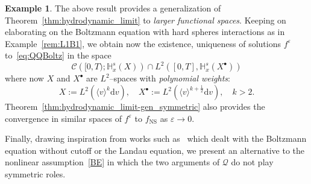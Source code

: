 \documentclass[10pt]{amsart}
\theoremstyle{definition}\newtheorem{defi}[theo]{Definition}\newtheorem{rema}[theo]{Remark}\newtheorem{exam}[theo]{Example}\newtheorem{exem}[theo]{Example}\newtheorem{nota}[theo]{Notation}
\newcommand{\ns}{\mathrm{NS}}
\renewcommand{\d}{\mathrm{d}}
\newcommand{\bbH}{\mathbb{H}}
\newcommand{\CC}{\mathcal{C}}
\newcommand{\QQ}{\mathcal{Q}}
\newcommand{\Sl}{X}
\newcommand{\Slp}{X^{\bullet}}
\newcommand*\eps{{\varepsilon}}
\newcommand{\la}{\langle}
\newcommand{\ra}{\rangle}
\begin{document}
\begin{exem}
The above result provides a generalization of Theorem~\ref{thm:hydrodynamic_limit} to \emph{larger functional spaces}. Keeping on elaborating on the Boltzmann equation with hard spheres interactions as in Example~\ref{rem:L1B1}, we obtain now the existence, uniqueness of solutions $f^{\eps}$ to~\eqref{eq:QQBoltz} in the space
\[
\CC\left([0, T) ; \bbH^s_x \left(\Sl \right) \right) \cap L^{2}\left([0,T],\bbH^{s}_{x}(\Slp)\right)
\]
where now $\Sl$ and $\Slp$ are $L^{2}$--spaces with \emph{polynomial weights}:
\[
\Sl := L^2\left(\la v \ra^k \d v \right), \quad \Slp := L^2\left(\la v \ra^{k+\frac{1}{2}}\d v\right), \quad k > 2.
\]
Theorem~\ref{thm:hydrodynamic_limit-gen_symmetric} also provides the convergence in similar spaces of $f^{\eps}$ to $f_\ns$ as $\eps \to 0.$
\end{exem}

Finally, drawing inspiration from works such as~\cite{CG2022,CM2017,CTW2016, HTT2020} which dealt with the Boltzmann equation without cutoff or the Landau equation, we present an alternative to the nonlinear assumption~\eqref{BE} in which the two arguments of $\QQ$ do not play symmetric roles.
\end{document}
